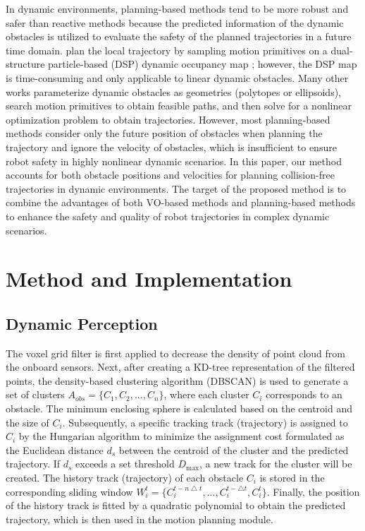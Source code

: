 \documentclass[preprint,5p,times,twocolumn,authoryear]{elsarticle}
\begin{document}
In dynamic environments, planning-based methods tend to be more robust and safer than reactive methods because the predicted information of the dynamic obstacles is utilized to evaluate the safety of the planned trajectories in a future time domain. \cite{chen2023risk} plan the local trajectory by sampling motion primitives on a dual-structure particle-based (DSP) dynamic occupancy map \citep{chen2022continuous}; however, the DSP map is time-consuming and only applicable to linear dynamic obstacles. Many other works \citep{wang2021autonomous, tordesillas2022panther, tordesillas2021mader} parameterize dynamic obstacles as geometries (polytopes or ellipsoids), search motion primitives to obtain feasible paths, and then solve for a nonlinear optimization problem to obtain trajectories. However, most planning-based methods consider only the future position of obstacles when planning the trajectory and ignore the velocity of obstacles, which is insufficient to ensure robot safety in highly nonlinear dynamic scenarios. In this paper, our method accounts for both obstacle positions and velocities for planning collision-free trajectories in dynamic environments. The target of the proposed method is to combine the advantages of both VO-based methods and planning-based methods to enhance the safety and quality of robot trajectories in complex dynamic scenarios.


\section{Method and Implementation}
\label{Implementation}

\subsection{Dynamic Perception}
\label{Dynamic_Perception}
The voxel grid filter is first applied to decrease the density of point cloud from the onboard sensors. Next, after creating a KD-tree representation of the filtered points, the density-based clustering algorithm (DBSCAN) \citep{nasibov2009robustness} is used to generate a set of clusters $A_{obs}=\{C_1,C_2,...,C_n\}$, where each cluster $C_i$ corresponds to an obstacle. The minimum enclosing sphere is calculated based on the centroid and the size of $C_i$. Subsequently, a specific tracking track (trajectory) is assigned to $C_i$ by the Hungarian \citep{kuhn2005hungarian} algorithm to minimize the assignment cost formulated as the Euclidean distance $d_s$ between the centroid of the cluster and the predicted trajectory. If $d_s$ exceeds a set threshold $D_{\max}$, a new track for the cluster will be created. The history track (trajectory) of each obstacle $C_i$ is stored in the corresponding sliding window $W_i^{t} = \{C_i^{t-n \bigtriangleup t},...,C^{t-\bigtriangleup t}_i, C_i^{t}\}$. Finally, the position of the history track is fitted by a quadratic polynomial to obtain the predicted trajectory, which is then used in the motion planning module.
\end{document}
